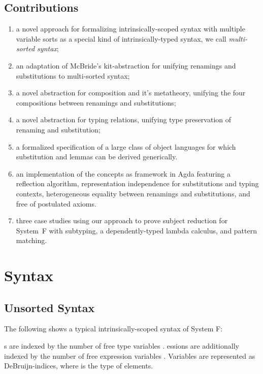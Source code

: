 \documentclass[sigplan,10pt, anonymous]{acmart}
\newenvironment{ExampleCode*}{%
  \begin{tcolorbox}[%
    colframe=white,%
    colback=yellow!5,%
    boxrule=0.0pt,%
    top=2.5pt,%
    left=2.5pt,%
    bottom=2.5pt,%
    right=2.5pt,%
    boxsep=0pt%
  ]\vspace{-0.2\baselineskip}%
}{%
  \vspace{-1\baselineskip}%
  \end{tcolorbox}%
}
\newcommand*\ExampleCode[1]{\begin{ExampleCode*}{#1}\end{ExampleCode*}}
\newcommand*\ACode[1]{\AgdaFontStyle{\textcolor{mygray}{#1}}}
\newcommand*\ACon[1]{\AgdaInductiveConstructor{#1}}
\begin{document}
  \subsection{Contributions}
  \label{sec:introduction:contributions}
  \begin{enumerate}
  \item
    a novel approach for formalizing intrinsically-scoped syntax with
    multiple variable sorts as a special kind of intrinsically-typed
    syntax, we call \emph{multi-sorted syntax};
  \item
    an adaptation of McBride's kit-abstraction for unifying renamings
    and substitutions to multi-sorted syntax;
  \item
    a novel abstraction for composition and it's metatheory, unifying
    the four compositions between renamings and substitutions;
  \item
    a novel abstraction for typing relations, unifying type
    preservation of renaming and substitution;
  \item
    a formalized specification of a large class of object languages
    for which substitution and lemmas can be derived generically.
  \item
    an implementation of the concepts as framework in Agda featuring
    a reflection algorithm, representation independence for
    substitutions and typing contexts, heterogeneous equality between
    renamings and substitutions, and free of postulated axioms.
  \item
    three case studies using our approach to prove subject reduction
    for System~F with subtyping, a dependently-typed lambda calculus, and
    pattern matching.
  \end{enumerate}

  \section{Syntax}
  \label{sec:syntax}
  \subsection{Unsorted Syntax}
  \label{sec:syntax:single}
  The following shows a typical intrinsically-scoped syntax of System F:
  \ExampleCode\FUnsortedSyntax

  \ACode{\ACon{Type}}s are indexed by the number of free type
  variables \ACode{n}.
  \ACode{\ACon{Expr}}essions are additionally indexed by the number of
  free expression variables \ACode{m}.
  Variables \ACode{\ACon{`\_}} are represented as DeBruijn-indices, where
  \ACode{\ACon{Fin} n} is the type of \ACode{n} elements.
\end{document}
